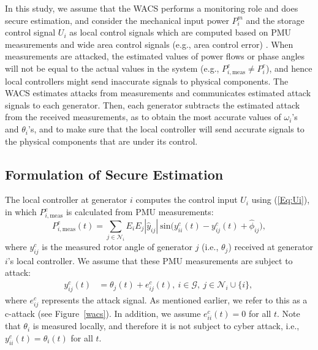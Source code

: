 In this study, we assume that the WACS performs a monitoring role and does secure estimation, and consider the mechanical input power $P_i^m$ and the storage control signal $U_i$ as local control signals which are computed based on PMU measurements and wide area control signals (e.g., area control error) \cite{Kundur}. When measurements are attacked, the estimated values of power flows or phase angles will not be equal to the actual values in the system (e.g., $P_{i,\text{meas}}^e \neq P_{i}^e$), and hence local controllers might send inaccurate signals to physical components. The WACS estimates attacks from measurements and communicates estimated attack signals to each generator. Then, each generator subtracts the estimated attack from the received measurements, as to obtain the most accurate values of $\omega_{i}$'s and $\theta_{i}$'s, and to make sure that the local controller will send accurate signals to the physical components that are under its control.




\vspace{-0.2cm}
\subsection{Formulation of Secure Estimation}

The local controller at generator $i$ computes the control input $U_i$ using (\ref{Eq:Ui}), in which $P_{i,\text{meas}}^e$ is calculated from PMU measurements:
\begin{equation}\label{eq:Pe_meas}
P_{i,\text{meas}}^e(t) = \sum_{j\in\mathcal{N}_i}{E_i E_j {|\widehat{y}_{ij}|} ~ \text{sin}\big(y^c_{ii}(t)-y^c_{ij}(t)+\widehat{\phi}_{ij}\big)},
\end{equation}
where $y^c_{ij}$ is the measured rotor angle of generator $j$ (i.e., $\theta_j$) received at generator $i$'s local controller. We assume that these PMU measurements are subject to attack:
\begin{equation}\label{Eq:yc}
\begin{aligned}
y^c_{ij}(t) & = \theta_j(t) + e^c_{ij} (t),~ i \in \mathcal{G},~j \in \mathcal{N}_i \cup \{i\}, \,
\end{aligned}
\end{equation}
where $e^c_{ij}$ represents the attack signal. As mentioned earlier, we refer to this as a c-attack (see Figure~\ref{wacs}).
In addition, we assume $e^c_{ii}(t) = 0$ for all $t$. Note that $\theta_i$ is measured locally, and therefore it is not subject to cyber attack, i.e., $y^c_{ii}(t) = \theta_i(t)$ for all $t$.

